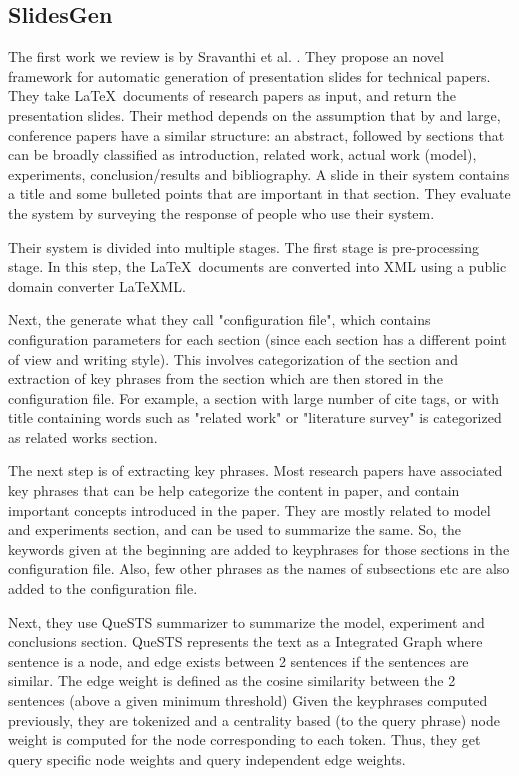 \documentclass[conference]{IEEEtran}
\begin{document}
\subsection{SlidesGen}
The first work we review is by Sravanthi et al. \cite{sravanthi}. They propose an
novel framework for automatic generation of presentation slides for technical papers.
They take \LaTeX\ documents of research papers as input, and return the presentation slides.
Their method depends on the assumption that by and large, conference papers have a similar structure:
an abstract, followed by sections that can be broadly classified as introduction, related work,
actual work (model), experiments, conclusion/results and bibliography.
A slide in their system contains a title and some bulleted points that are important in 
that section. They evaluate the system by surveying the response of people who use their system.

Their system is divided into multiple stages. The first stage is pre-processing stage.
In this step, the \LaTeX\ documents are converted into XML using a public domain converter
LaTeXML. 

Next, the generate what they call "configuration file", which contains configuration
parameters for each section (since each section has a different point of view and writing style).
This involves categorization of the section and extraction of key phrases from the section
which are then stored in the configuration file.
For example, a section with large number of cite tags, or with title containing words such as
"related work" or "literature survey" is categorized as related works section.

The next step is of extracting key phrases.	Most research papers have associated key phrases 
that can be help categorize the content in paper, and contain important concepts introduced
in the paper. They are mostly related to model and experiments section, and can be used to 
summarize the same. So, the keywords given at the beginning are added to keyphrases for those
sections in the configuration file. Also, few other phrases as the names of subsections etc 
are also added to the configuration file.

Next, they use QueSTS summarizer to summarize the model, experiment and conclusions section.
QueSTS represents the text as a Integrated Graph where sentence is a node, and edge exists 
between 2 sentences if the sentences are similar. The edge weight is defined as the 
cosine similarity between the 2 sentences (above a given minimum threshold)
Given the keyphrases computed previously, they are tokenized and 
a centrality based (to the query phrase) node weight is computed for the node corresponding to each token.
Thus, they get query specific node weights and query independent edge weights.
\end{document}
